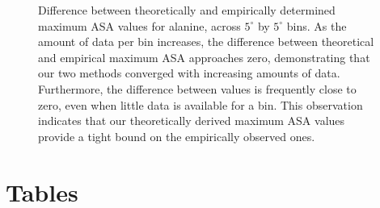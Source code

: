 \documentclass[11pt]{article}
\begin{document}
\begin{figure}[H]
\caption{\label{fig:EvC} Difference between theoretically and empirically determined maximum ASA values for alanine, across $5^\circ$ by $5^\circ$ bins. As the amount of data per bin increases, the difference between theoretical and empirical maximum ASA approaches zero, demonstrating that our two methods converged with increasing amounts of data. Furthermore, the difference between values is frequently close to zero, even when little data is available for a bin. This observation indicates that our theoretically derived maximum ASA values provide a tight bound on the empirically observed ones.}
\end{figure}

\cleardoublepage

\section*{Tables}
\end{document}
